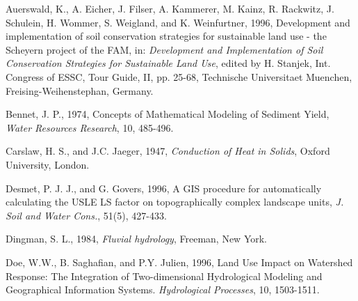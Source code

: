\documentclass{kapedbk} %
\begin{document}


%
%
%

\bigskip
\begin{chapthebibliography}{1}

\bibitem{}
{\ninerm
Auerswald, K., A. Eicher, J. Filser, A. Kammerer, M. Kainz, R. Rackwitz, 
J. Schulein, H. Wommer, S. Weigland, and K. Weinfurtner, 1996,
 Development and 
implementation of soil conservation strategies for sustainable land use 
- the Scheyern project of the FAM, in: {\it Development and Implementation of 
Soil Conservation Strategies for Sustainable Land Use}, 
edited by H. Stanjek, Int. Congress of ESSC, Tour Guide, II, pp. 25-68, 
Technische Universitaet Muenchen, Freising-Weihenstephan, Germany.

\bibitem{}
Bennet, J. P., 1974, Concepts of Mathematical Modeling of Sediment Yield, 
{\it Water Resources Research}, 10, 485-496. 

\bibitem{} Carslaw, H. S., and J.C. Jaeger, 1947, {\it Conduction of Heat in Solids},
Oxford University, London.


\bibitem{}
Desmet, P. J. J., and G. Govers, 1996, A GIS procedure for automatically 
calculating the USLE LS factor on topographically complex landscape units, 
{\it J. Soil and Water Cons.}, 51(5), 427-433.


\bibitem{}
Dingman, S. L., 1984, {\it Fluvial hydrology}, Freeman, New York.

\bibitem{}
Doe, W.W., B. Saghafian, and P.Y. Julien, 1996, 
Land Use Impact on Watershed Response: 
The Integration of Two-dimensional Hydrological 
Modeling and Geographical Information Systems. 
{\it Hydrological Processes}, 10, 1503-1511.

}
\end{chapthebibliography}
\end{document}
